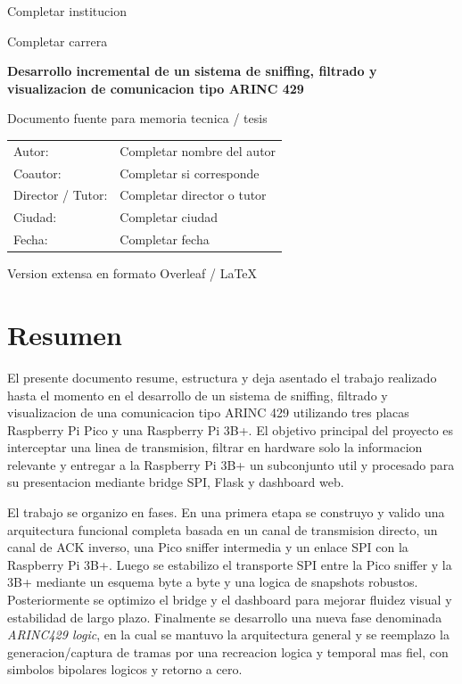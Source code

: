 \documentclass[12pt,a4paper,oneside]{report}
\newcommand{\TituloTesis}{Desarrollo incremental de un sistema de sniffing, filtrado y visualizacion de comunicacion tipo ARINC 429}
\newcommand{\AutorTesis}{Completar nombre del autor}
\newcommand{\CoautorTesis}{Completar si corresponde}
\newcommand{\DirectorTesis}{Completar director o tutor}
\newcommand{\InstitucionTesis}{Completar institucion}
\newcommand{\CarreraTesis}{Completar carrera}
\newcommand{\CiudadTesis}{Completar ciudad}
\newcommand{\FechaTesis}{Completar fecha}
\begin{document}
\begin{titlepage}
    \centering
    {\Large \InstitucionTesis \par}
    \vspace{0.8cm}
    {\large \CarreraTesis \par}
    \vspace{2.5cm}
    {\Huge \bfseries \TituloTesis \par}
    \vspace{2cm}
    {\Large Documento fuente para memoria tecnica / tesis \par}
    \vfill
    \begin{tabular}{ll}
        Autor: & \AutorTesis \\
        Coautor: & \CoautorTesis \\
        Director / Tutor: & \DirectorTesis \\
        Ciudad: & \CiudadTesis \\
        Fecha: & \FechaTesis \\
    \end{tabular}
    \vfill
    {\large Version extensa en formato Overleaf / LaTeX \par}
\end{titlepage}

\tableofcontents
\clearpage

\chapter*{Resumen}

El presente documento resume, estructura y deja asentado el trabajo realizado hasta el momento en el desarrollo de un sistema de sniffing, filtrado y visualizacion de una comunicacion tipo ARINC 429 utilizando tres placas Raspberry Pi Pico y una Raspberry Pi 3B+. El objetivo principal del proyecto es interceptar una linea de transmision, filtrar en hardware solo la informacion relevante y entregar a la Raspberry Pi 3B+ un subconjunto util y procesado para su presentacion mediante bridge SPI, Flask y dashboard web.

El trabajo se organizo en fases. En una primera etapa se construyo y valido una arquitectura funcional completa basada en un canal de transmision directo, un canal de ACK inverso, una Pico sniffer intermedia y un enlace SPI con la Raspberry Pi 3B+. Luego se estabilizo el transporte SPI entre la Pico sniffer y la 3B+ mediante un esquema byte a byte y una logica de snapshots robustos. Posteriormente se optimizo el bridge y el dashboard para mejorar fluidez visual y estabilidad de largo plazo. Finalmente se desarrollo una nueva fase denominada \textit{ARINC429 logic}, en la cual se mantuvo la arquitectura general y se reemplazo la generacion/captura de tramas por una recreacion logica y temporal mas fiel, con simbolos bipolares logicos y retorno a cero.
\end{document}
